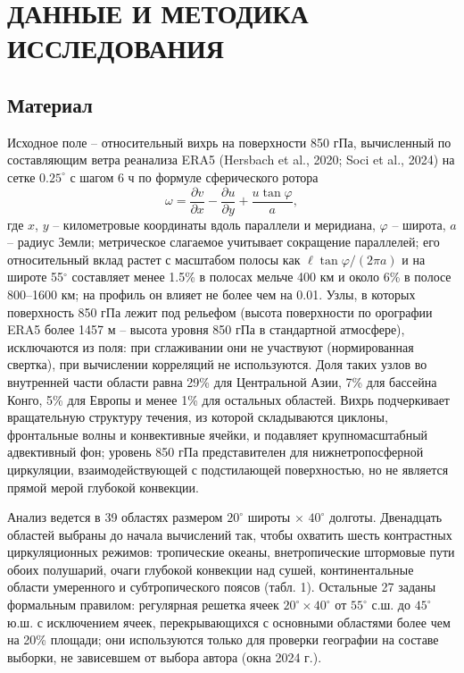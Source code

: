 \documentclass[12pt,a4paper]{article}
\begin{document}
\section{ДАННЫЕ И МЕТОДИКА ИССЛЕДОВАНИЯ}

\subsection{Материал}

Исходное поле -- относительный вихрь на поверхности 850 гПа, вычисленный по составляющим ветра реанализа ERA5 (Hersbach et al., 2020; Soci et al., 2024) на сетке $0.25^\circ$ с шагом 6 ч по формуле сферического ротора
\begin{equation}
\label{eq:vort}
\omega = \frac{\partial v}{\partial x} - \frac{\partial u}{\partial y} + \frac{u \tan\varphi}{a},
\end{equation}
где $x$, $y$ -- километровые координаты вдоль параллели и меридиана, $\varphi$ -- широта, $a$ -- радиус Земли; метрическое слагаемое учитывает сокращение параллелей; его относительный вклад растет с масштабом полосы как $\ell\tan\varphi/(2\pi a)$ и на широте 55$^\circ$ составляет менее 1.5\% в полосах мельче 400 км и около 6\% в полосе 800--1600 км; на профиль он влияет не более чем на 0.01. Узлы, в которых поверхность 850 гПа лежит под рельефом (высота поверхности по орографии ERA5 более 1457 м -- высота уровня 850 гПа в стандартной атмосфере), исключаются из поля: при сглаживании они не участвуют (нормированная свертка), при вычислении корреляций не используются. Доля таких узлов во внутренней части области равна 29\% для Центральной Азии, 7\% для бассейна Конго, 5\% для Европы и менее 1\% для остальных областей. Вихрь подчеркивает вращательную структуру течения, из которой складываются циклоны, фронтальные волны и конвективные ячейки, и подавляет крупномасштабный адвективный фон; уровень 850 гПа представителен для нижнетропосферной циркуляции, взаимодействующей с подстилающей поверхностью, но не является прямой мерой глубокой конвекции.

Анализ ведется в 39 областях размером $20^\circ$ широты $\times$ $40^\circ$ долготы. Двенадцать областей выбраны до начала вычислений так, чтобы охватить шесть контрастных циркуляционных режимов: тропические океаны, внетропические штормовые пути обоих полушарий, очаги глубокой конвекции над сушей, континентальные области умеренного и субтропического поясов (табл. 1). Остальные 27 заданы формальным правилом: регулярная решетка ячеек $20^\circ \times 40^\circ$ от $55^\circ$ с.ш. до $45^\circ$ ю.ш. с исключением ячеек, перекрывающихся с основными областями более чем на 20\% площади; они используются только для проверки географии на составе выборки, не зависевшем от выбора автора (окна 2024 г.).
\end{document}
